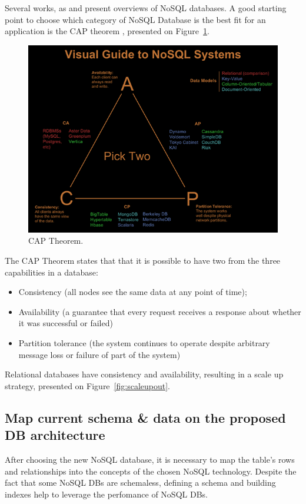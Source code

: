 Several works, as \cite{6106531} and \cite{5410700} present overviews of NoSQL databases. A good starting point to choose which category of NoSQL Database is the best fit for an application is the CAP theorem \cite{nosqlthoughtworks}, presented on Figure~\ref{fig:cap}. 

\begin{figure}[ht!]
\centering
\includegraphics[width=120mm]{Imagens/cap.png}
\caption{CAP Theorem.\cite{captheorem}\label{fig:cap}}
\end{figure}

The CAP Theorem states that that it is possible to have two from the three capabilities in a database: 
\begin{itemize}
\item{Consistency (all nodes see the same data at any point of time);}
\item{Availability (a guarantee that every request receives a response about whether it was successful or failed)}
\item{Partition tolerance (the system continues to operate despite arbitrary message loss or failure of part of the system)
}
\end{itemize}

Relational databases have consistency and availability, resulting in a scale up strategy, presented on Figure~\ref{fig:scaleupout}.

\subsection{Map current schema \& data on the proposed DB architecture}
After choosing the new NoSQL database, it is necessary to map the table's rows and relationships into the concepts of the chosen NoSQL technology. Despite the fact that some NoSQL DBs are schemaless, defining a schema and building indexes help to leverage the perfomance of NoSQL DBs.

